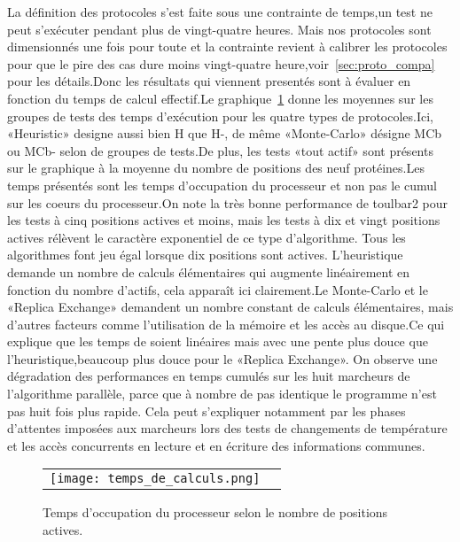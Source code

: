 La définition des protocoles s'est faite sous une contrainte de temps,un test ne peut s'exécuter pendant plus de vingt-quatre heures. Mais nos protocoles sont dimensionnés une fois pour toute et la contrainte revient à calibrer les protocoles pour que le pire des cas dure moins vingt-quatre heure,voir~\ref{sec:proto_compa} pour les détails.Donc les résultats qui viennent presentés sont à évaluer en fonction du temps de calcul effectif.Le graphique~\ref{graph:temps_CPU} donne les moyennes sur les groupes de tests des temps d'exécution pour les quatre types de protocoles.Ici, «Heuristic» designe aussi bien H que H-, de même «Monte-Carlo» désigne MCb ou MCb- selon de groupes de tests.De plus, les tests «tout actif» sont présents sur le graphique à la moyenne du nombre de positions des neuf protéines.Les temps présentés sont les temps d'occupation du processeur et non pas le cumul sur les coeurs du processeur.On note la très bonne performance de toulbar2 pour les tests à cinq positions actives et moins, mais les tests à dix et vingt positions actives rélèvent le caractère exponentiel de ce type d'algorithme. Tous les algorithmes font jeu égal lorsque dix positions sont actives. L'heuristique demande un nombre de calculs élémentaires qui augmente linéairement en fonction du nombre d'actifs, cela apparaît ici clairement.Le Monte-Carlo et le «Replica Exchange» demandent un nombre constant de calculs élémentaires, mais d'autres facteurs comme l'utilisation de la mémoire et les accès au disque.Ce qui explique que les temps de soient linéaires mais avec une pente plus douce que l'heuristique,beaucoup plus douce pour le «Replica Exchange». On observe une dégradation des performances en temps cumulés sur les huit marcheurs de l'algorithme parallèle, parce que à nombre de pas identique le programme n'est pas huit fois plus rapide. Cela peut s'expliquer notamment par les phases d'attentes imposées aux marcheurs lors des tests de changements de température et les accès concurrents en lecture et en écriture des informations communes.      

    
    \begin{figure}[h]
      \centering
      \begin{tabular}{cc}
        \texttt{[image: temps\_de\_calculs.png]} &
      \end{tabular}
      
      \caption{Temps d'occupation du processeur selon le nombre de positions actives.}
\label{graph:temps_CPU}
    \end{figure}

